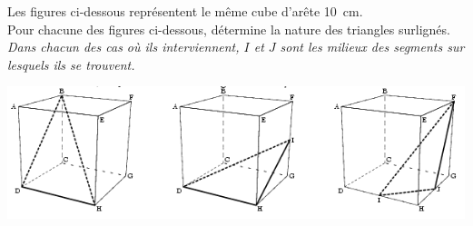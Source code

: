 
Les figures ci-dessous représentent le même cube d'arête 10~cm.\\
Pour chacune des figures ci-dessous, détermine la nature des triangles surlignés.
{\em Dans chacun des cas où ils interviennent, $I$ et $J$ sont les milieux des segments sur lesquels ils se trouvent.}\\
\begin{center}
 \includegraphics[scale=1]{RepS-exo2.png}
 \end{center} 


